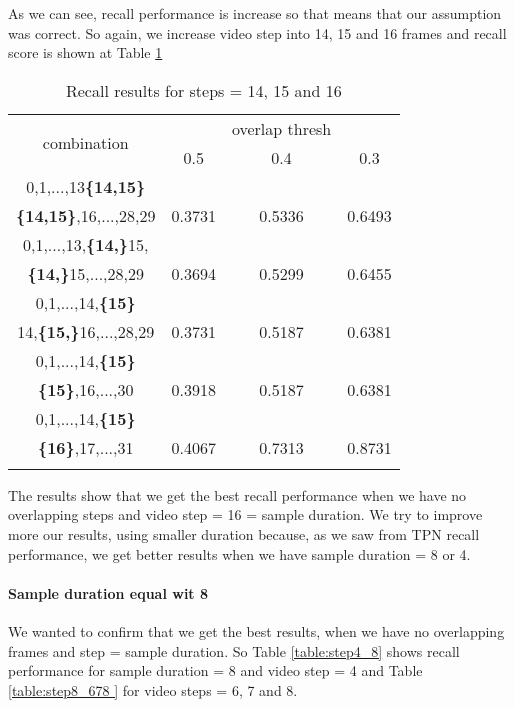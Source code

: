 As we can see, recall performance is increase so that means that our assumption was correct. So again, we increase video step into 14, 15 and 16 frames
and recall score is shown at Table \ref{table:step14_16}
\begin{center}
\begin{longtable}{||c||c c c||}

  \hline
  \multirow{2}{5em}{combination} & {} &overlap thresh & {} \\
                                    &  0.5  &  0.4 &  0.3 \\         
  \hline  \hline
  0,1,...,13\textbf{\{14,15\}}                & {} & {} & {} \\
  \textbf{\{14,15\}},16,...,28,29                & 0.3731 & 0.5336 & 0.6493 \\
  \hline     \hline                          

  0,1,...,13,\textbf{\{14,\}}15,              & {} & {} & {} \\
  \textbf{\{14,\}}15,...,28,29                & 0.3694   & 0.5299 & 0.6455 \\
  \hline                          
  0,1,...,14,\textbf{\{15\}}                  & {} & {} & {} \\
  14,\textbf{\{15,\}}16,...,28,29             & 0.3731   & 0.5187 & 0.6381 \\
  \hline  \hline

  0,1,...,14,\textbf{\{15\}}                & {} & {} & {} \\
  \textbf{\{15\}},16,...,30                 & 0.3918 & 0.5187 & 0.6381 \\
  \hline     \hline                          
  0,1,...,14,\textbf{\{15\}}                & {} & {} & {} \\
  \textbf{\{16\}},17,...,31                 & 0.4067 & 0.7313 & 0.8731 \\
  \hline                          
  \caption{Recall results for steps = 14, 15 and 16}
  \label{table:step14_16}
\end{longtable} 
\end{center}

The results show that we get the best recall performance when we have no overlapping steps and video step = 16 = sample duration. We try to improve
more our results, using smaller duration because, as we saw from TPN recall performance, we get better results when we have sample duration = 8 or 4.

\paragraph{Sample duration equal wit  8}
We wanted to confirm that we get the best results, when we have no overlapping frames and step = sample duration. So Table \ref{table:step4_8}
shows recall performance for sample duration = 8 and video step = 4 and Table \ref{table:step8_678 } for video steps = 6, 7 and 8.


